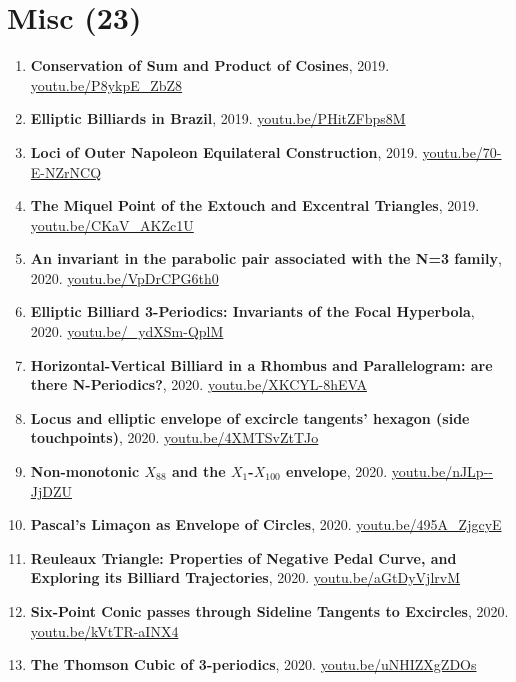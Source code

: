 \documentclass[12pt]{article}
\begin{document}
\section{Misc (23)}

\begin{enumerate}[resume]
\item \textbf{Conservation of Sum and Product of Cosines}, 2019. \href{https://youtu.be/P8ykpE_ZbZ8}{\url{youtu.be/P8ykpE\_ZbZ8}}
\item \textbf{Elliptic Billiards in Brazil}, 2019. \href{https://youtu.be/PHitZFbps8M}{\url{youtu.be/PHitZFbps8M}}
\item \textbf{Loci of Outer Napoleon Equilateral Construction}, 2019. \href{https://youtu.be/70-E-NZrNCQ}{\url{youtu.be/70-E-NZrNCQ}}
\item \textbf{The Miquel Point of the Extouch and Excentral Triangles}, 2019. \href{https://youtu.be/CKaV_AKZc1U}{\url{youtu.be/CKaV\_AKZc1U}}
\item \textbf{An invariant in the parabolic pair associated with the N=3 family}, 2020. \href{https://youtu.be/VpDrCPG6th0}{\url{youtu.be/VpDrCPG6th0}}
\item \textbf{Elliptic Billiard 3-Periodics: Invariants of the Focal Hyperbola}, 2020. \href{https://youtu.be/_ydXSm-QplM}{\url{youtu.be/\_ydXSm-QplM}}
\item \textbf{Horizontal-Vertical Billiard in a Rhombus and Parallelogram: are there N-Periodics?}, 2020. \href{https://youtu.be/XKCYL-8hEVA}{\url{youtu.be/XKCYL-8hEVA}}
\item \textbf{Locus and elliptic envelope of excircle tangents' hexagon (side touchpoints)}, 2020. \href{https://youtu.be/4XMTSvZtTJo}{\url{youtu.be/4XMTSvZtTJo}}
\item \textbf{Non-monotonic $X_{88}$ and the $X_{1}$-$X_{100}$ envelope}, 2020. \href{https://youtu.be/nJLp--JjDZU}{\url{youtu.be/nJLp--JjDZU}}
\item \textbf{Pascal's Limaçon as Envelope of Circles}, 2020. \href{https://youtu.be/495A_ZjgcyE}{\url{youtu.be/495A\_ZjgcyE}}
\item \textbf{Reuleaux Triangle: Properties of Negative Pedal Curve, and Exploring its Billiard Trajectories}, 2020. \href{https://youtu.be/aGtDyVjlrvM}{\url{youtu.be/aGtDyVjlrvM}}
\item \textbf{Six-Point Conic passes through Sideline Tangents to Excircles}, 2020. \href{https://youtu.be/kVtTR-aINX4}{\url{youtu.be/kVtTR-aINX4}}
\item \textbf{The Thomson Cubic of 3-periodics}, 2020. \href{https://youtu.be/uNHIZXgZDOs}{\url{youtu.be/uNHIZXgZDOs}}

\end{enumerate}
\end{document}
